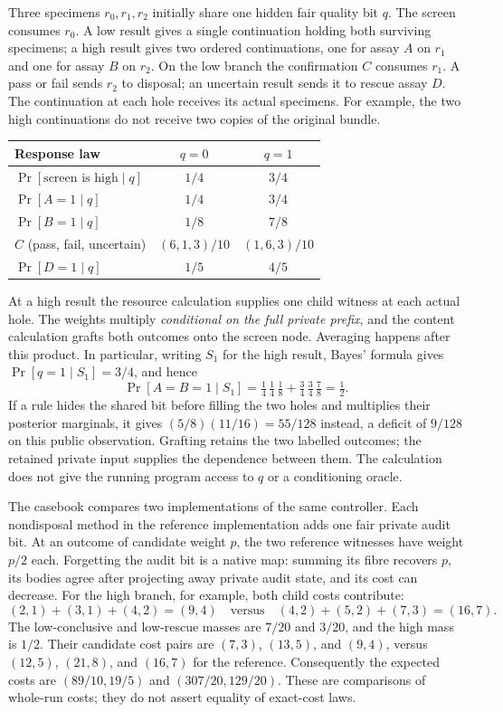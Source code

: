 \documentclass[11pt]{article}
\numberwithin{equation}{section}
\theoremstyle{definition}\newtheorem{definition}[theorem]{Definition}
\begin{document}
Three specimens $r_0,r_1,r_2$ initially share one hidden fair quality
bit $q$. The screen consumes $r_0$. A low result gives a single
continuation holding both surviving specimens; a high result gives two
ordered continuations, one for assay $A$ on $r_1$ and one for assay
$B$ on $r_2$. On the low branch the confirmation $C$ consumes $r_1$.
A pass or fail sends $r_2$ to disposal; an uncertain result sends it
to rescue assay $D$. The continuation at each hole receives its
actual specimens. For example, the two high continuations do not
receive two copies of the original bundle.

\begin{center}\small
\begin{tabular}{@{}lcc@{}}
\toprule
Response law & $q=0$ & $q=1$\\
\midrule
$\Pr[\text{screen is high}\mid q]$&$1/4$&$3/4$\\
$\Pr[A=1\mid q]$&$1/4$&$3/4$\\
$\Pr[B=1\mid q]$&$1/8$&$7/8$\\
$C$ (pass, fail, uncertain)&$(6,1,3)/10$&$(1,6,3)/10$\\
$\Pr[D=1\mid q]$&$1/5$&$4/5$\\
\bottomrule
\end{tabular}
\end{center}
At a high result the resource calculation supplies one child witness
at each actual hole. The weights multiply \emph{conditional on the full
private prefix}, and the content calculation grafts both outcomes onto
the screen node. Averaging happens after this product. In particular,
writing $S_1$ for the high result, Bayes' formula gives
$\Pr[q=1\mid S_1]=3/4$, and hence
\[
 \Pr[A=B=1\mid S_1]
 =\tfrac14\,\tfrac14\,\tfrac18+\tfrac34\,\tfrac34\,\tfrac78
 =\tfrac12.
\]
If a rule hides the shared bit before filling the two holes and
multiplies their posterior marginals, it gives
$(5/8)(11/16)=55/128$ instead, a deficit of $9/128$ on this public
observation. Grafting retains the two labelled outcomes; the retained
private input supplies the dependence between them. The calculation
does not give the running program access to $q$ or a conditioning
oracle.

The casebook compares two implementations of the same controller.
Each nondisposal method in the reference implementation adds one fair
private audit bit. At an outcome of candidate weight $p$, the two
reference witnesses have weight $p/2$ each. Forgetting the audit bit
is a native map: summing its fibre recovers $p$, its bodies agree
after projecting away private audit state, and its cost can decrease.
For the high branch, for example, both child costs contribute:
\[
 (2,1)+(3,1)+(4,2)=(9,4)
 \quad\text{versus}\quad
 (4,2)+(5,2)+(7,3)=(16,7).
\]
The low-conclusive and low-rescue masses are $7/20$ and $3/20$,
and the high mass is $1/2$. Their candidate cost pairs are $(7,3)$,
$(13,5)$, and $(9,4)$, versus $(12,5)$, $(21,8)$, and $(16,7)$
for the reference. Consequently the expected costs are
$(89/10,19/5)$ and $(307/20,129/20)$. These are comparisons of
whole-run costs; they do not assert equality of exact-cost laws.
\end{document}
